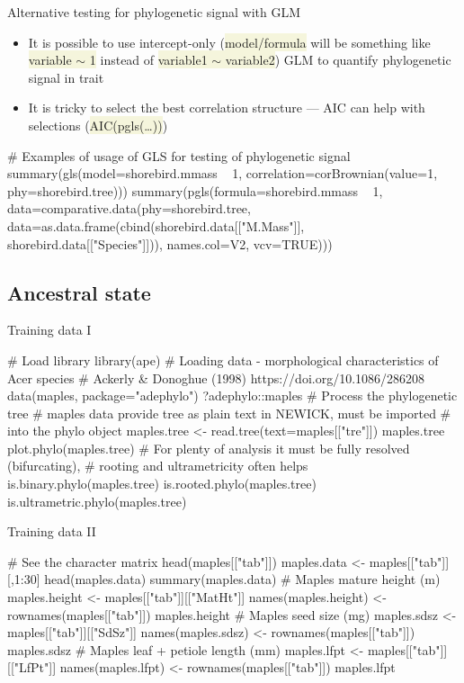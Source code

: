\documentclass[compress, xelatex, 11pt, xcolor=svgnames, aspectratio=169, url={hyphens, lowtilde}]{beamer}
\renewcommand{\texttt}[1]{\colorbox{Beige}{{\ttfamily #1}}}
\begin{document}
\begin{frame}[fragile]{Alternative testing for phylogenetic signal with GLM}
	\begin{itemize}
		\item It is possible to use intercept-only (\texttt{model/formula} will be something like \texttt{variable $\sim$ 1} instead of \texttt{variable1 $\sim$ variable2}) GLM to quantify phylogenetic signal in trait
		\item It is tricky to select the best correlation structure --- AIC can help with selections (\texttt{AIC(pgls(\ldots))})
	\end{itemize}
	\begin{spluscode}
    # Examples of usage of GLS for testing of phylogenetic signal
    summary(gls(model=shorebird.mmass ~ 1,
      correlation=corBrownian(value=1, phy=shorebird.tree)))
    summary(pgls(formula=shorebird.mmass ~ 1,
      data=comparative.data(phy=shorebird.tree,
      data=as.data.frame(cbind(shorebird.data[["M.Mass"]],
      shorebird.data[["Species"]])), names.col=V2, vcv=TRUE)))
	\end{spluscode}
\end{frame}

\subsection{Ancestral state}

\begin{frame}[fragile]{Training data I}
	\begin{spluscode}
    # Load library
    library(ape)
    # Loading data - morphological characteristics of Acer species
    # Ackerly & Donoghue (1998) https://doi.org/10.1086/286208
    data(maples, package="adephylo")
    ?adephylo::maples
    # Process the phylogenetic tree
    # maples data provide tree as plain text in NEWICK, must be imported
    # into the phylo object
    maples.tree <- read.tree(text=maples[["tre"]])
    maples.tree
    plot.phylo(maples.tree)
    # For plenty of analysis it must be fully resolved (bifurcating),
    # rooting and ultrametricity often helps
    is.binary.phylo(maples.tree)
    is.rooted.phylo(maples.tree)
    is.ultrametric.phylo(maples.tree)
	\end{spluscode}
\end{frame}

\begin{frame}[fragile]{Training data II}
	\begin{spluscode}
    # See the character matrix
    head(maples[["tab"]])
    maples.data <- maples[["tab"]][,1:30]
    head(maples.data)
    summary(maples.data)
    # Maples mature height (m)
    maples.height <- maples[["tab"]][["MatHt"]]
    names(maples.height) <- rownames(maples[["tab"]])
    maples.height
    # Maples seed size (mg)
    maples.sdsz  <- maples[["tab"]][["SdSz"]]
    names(maples.sdsz) <- rownames(maples[["tab"]])
    maples.sdsz
    # Maples leaf + petiole length (mm)
    maples.lfpt <- maples[["tab"]][["LfPt"]]
    names(maples.lfpt) <- rownames(maples[["tab"]])
    maples.lfpt
	\end{spluscode}
\end{frame}
\end{document}
